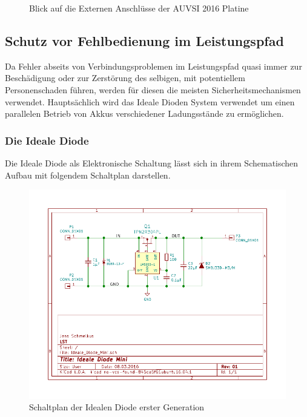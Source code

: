 \begin{figure}[H]
\centering
{}
\caption{Blick auf die Externen Anschlüsse der AUVSI 2016 Platine} 
\label{fig:Blick auf die Externen Anschlüsse der AUVSI 2016 Platine}
\end{figure}


\subsection{Schutz vor Fehlbedienung im Leistungspfad}

Da Fehler abseits von Verbindungsproblemen im Leistungspfad quasi immer zur Beschädigung oder zur Zerstörung des selbigen, mit potentiellem Personenschaden führen, werden für diesen die meisten Sicherheitsmechanismen verwendet.
Hauptsächlich wird das Ideale Dioden System verwendet um einen parallelen Betrieb von Akkus verschiedener Ladungsstände zu ermöglichen.

\subsubsection{Die Ideale Diode}

Die Ideale Diode als Elektronische Schaltung lässt sich in ihrem Schematischen Aufbau mit folgendem Schaltplan darstellen.

\begin{figure}[H]
\centering
\includegraphics[width=1.0\textwidth]{Schaltplaene/Ideale_Diode_Mini.pdf} 
\caption{Schaltplan der Idealen Diode erster Generation} 
\label{fig:Schaltplan der Idealen Diode erster Generation}
\end{figure}

